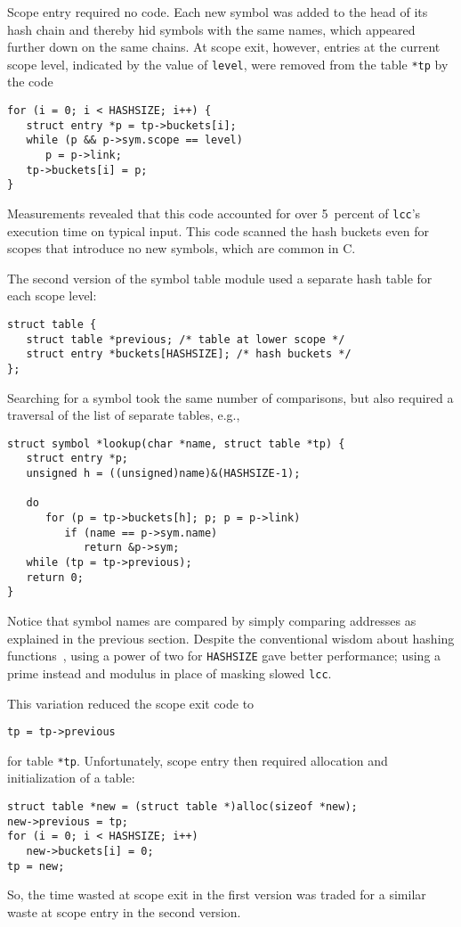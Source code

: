 Scope entry required no code.
Each new symbol was added to the head of its hash chain
and thereby hid symbols with the same names,
which appeared further down on the same chains.
At scope exit, however, entries at the current
scope level, indicated by the value of \verb|level|,
were removed from the table \verb|*tp| by the code
\begin{verbatim}
for (i = 0; i < HASHSIZE; i++) {
   struct entry *p = tp->buckets[i];
   while (p && p->sym.scope == level)
      p = p->link;
   tp->buckets[i] = p;
}
\end{verbatim}
Measurements revealed that this code accounted for over
5~percent of \verb|lcc|'s execution time on typical input.
This code scanned the hash buckets even for scopes that
introduce no new symbols, which are common in C.

The second version of the symbol table module used
a separate hash table for each scope level:
\begin{verbatim}
struct table {
   struct table *previous; /* table at lower scope */
   struct entry *buckets[HASHSIZE]; /* hash buckets */
};
\end{verbatim}
Searching for a symbol took the same number
of comparisons, but also required a traversal
of the list of separate tables, e.g.,
\begin{verbatim}
struct symbol *lookup(char *name, struct table *tp) {
   struct entry *p;
   unsigned h = ((unsigned)name)&(HASHSIZE-1);

   do
      for (p = tp->buckets[h]; p; p = p->link)
         if (name == p->sym.name)
            return &p->sym;
   while (tp = tp->previous);
   return 0;
}
\end{verbatim}
Notice that symbol names are compared by simply
comparing addresses as explained in the previous section.
Despite the conventional wisdom about hashing functions~\cite{sedgewick88},
using a power of two for \verb|HASHSIZE| gave
better performance; using a prime instead and modulus in place
of masking slowed \verb|lcc|.

This variation reduced the scope exit code to
\begin{verbatim}
tp = tp->previous
\end{verbatim}
for table \verb|*tp|. Unfortunately, scope entry
then required allocation and initialization of a table:
\begin{verbatim}
struct table *new = (struct table *)alloc(sizeof *new);
new->previous = tp;
for (i = 0; i < HASHSIZE; i++)
   new->buckets[i] = 0;
tp = new;
\end{verbatim}
So, the time wasted at scope exit in the first version
was traded for a similar waste at scope entry in the second version.

